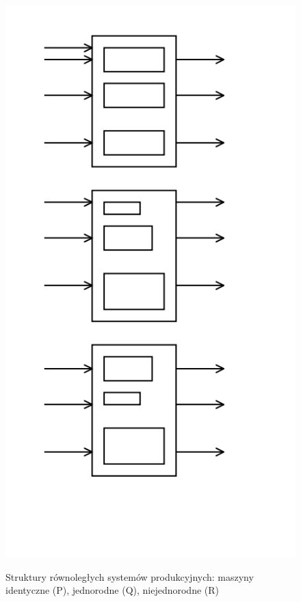 \documentclass[10pt, a
4paper]{article}
\begin{document}
\begin{figure}[H]
\begin{center}
\label{diagram}
\includegraphics[scale = 0.5]{Rysunki/szeregowanie3.png}
\caption{ Struktury równoległych systemów produkcyjnych: maszyny
identyczne (P), jednorodne (Q), niejednorodne (R)}
\end{center}
\end{figure}
\end{document}
